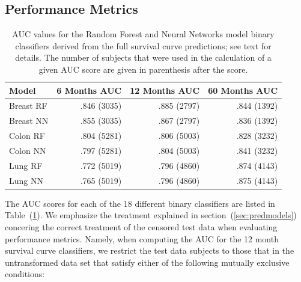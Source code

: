 \documentclass[a4paper,11pt]{article}
\begin{document}
\subsection{Performance Metrics}
\label{sec:performancemetrics}



\begin{table}[tbp]
\begin{center}
\begin{tabular}{lrrr}
\toprule
Model & 6 Months AUC & 12 Months AUC & 60 Months AUC \\ 
\midrule
Breast RF &  .846  (3035)     &     .885  (2797)         &  .844 (1392) \\ 
Breast NN &   .855 (3035)    &     .867  (2797)    &    .836  (1392) \\ 
Colon RF  &     .804 (5281)         &      .806 (5003)          &      .828   (3232)        \\ 
Colon NN   &     .797 (5281)         &          .804 (5003)        &   .841 (3232) \\ 
Lung RF    &      .772  (5019)             &        .796 (4860)              &   .874 (4143)  \\ 
Lung NN    &        .765  (5019)            &        .796  (4860)             &  .875 (4143)  \\
\bottomrule
\end{tabular}
\caption{\label{tab:AUC} AUC values for the Random Forest and Neural Networks model
binary classifiers derived from the full survival curve predictions; see text for details. The number of subjects that were used in the calculation of a given AUC score are given in parenthesis after the score. }
\end{center}
\end{table}

The AUC scores for each of the 18 different binary classifiers are listed in Table~(\ref{tab:AUC}). We emphasize the treatment explained in section~(\ref{sec:predmodels})  concering the correct treatment of the censored test data when evaluating performance metrics.
Namely, when computing the AUC for the 12 month survival curve classifiers, we restrict the test data subjects to those that in the untransformed data set that satisfy either of the following mutually exclusive conditions:
\end{document}
